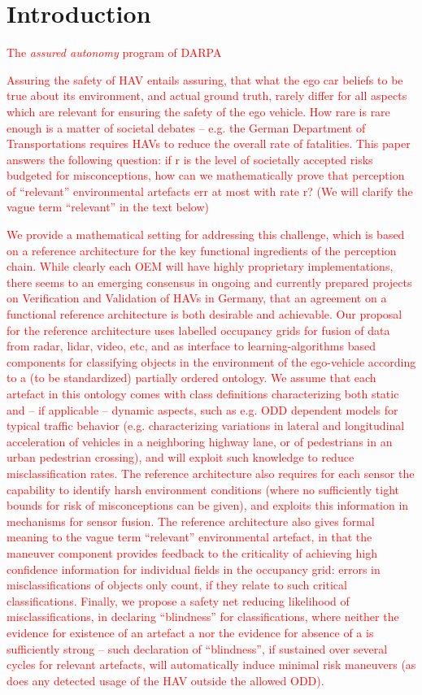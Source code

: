 \section{Introduction}
\textcolor{red}{The \emph{assured autonomy} program of DARPA~\cite{AssuredAutonomy}

Assuring the safety of HAV entails assuring, that what the ego car beliefs to be true about its environment, and actual ground truth, rarely differ for all aspects which are relevant for ensuring the safety of the ego vehicle. How rare is rare enough is a matter of societal debates -- e.g. the German Department of Transportations requires HAVs to reduce the overall rate of fatalities. This paper answers the following question: if  r  is the level of societally accepted risks budgeted for misconceptions, how can we mathematically prove that perception of \enquote{relevant} environmental artefacts err at most with rate r? (We will clarify the vague term \enquote{relevant} in the text below)

We provide a mathematical setting for addressing this challenge, which is based on a reference architecture for the key functional ingredients of the perception chain. While clearly each OEM will have highly proprietary implementations, there seems to an emerging consensus in ongoing and currently prepared projects on Verification and Validation of HAVs in Germany, that an agreement on a functional reference architecture is both desirable and achievable. Our proposal for the reference architecture uses labelled occupancy grids for fusion of data from radar, lidar, video, etc, and as interface to learning-algorithms based components for classifying objects in the environment of the ego-vehicle according to a (to be standardized) partially ordered ontology. We assume that each artefact in this ontology comes with class definitions characterizing both static and – if applicable – dynamic aspects, such as e.g. ODD dependent models for typical traffic behavior (e.g. characterizing variations in lateral and longitudinal acceleration of vehicles in a neighboring highway lane, or of pedestrians in an urban pedestrian crossing), and will exploit such knowledge to reduce misclassification rates. The reference architecture also requires for each sensor the capability to identify harsh environment conditions (where no sufficiently tight bounds for risk of misconceptions can be given), and exploits this information in mechanisms for sensor fusion. The reference architecture also gives formal meaning to the vague term \enquote{relevant} environmental artefact, in that the maneuver component provides feedback to the criticality of achieving high confidence information for individual fields in the occupancy grid: errors in misclassifications of objects only count, if they relate to such critical classifications. Finally, we propose a safety net reducing likelihood of misclassifications, in declaring \enquote{blindness} for classifications, where neither the evidence for existence of an artefact a nor the evidence for absence of a is sufficiently strong – such declaration of \enquote{blindness}, if sustained over several cycles for relevant artefacts, will automatically induce minimal risk maneuvers (as does any detected usage of the HAV outside the allowed ODD).

}
